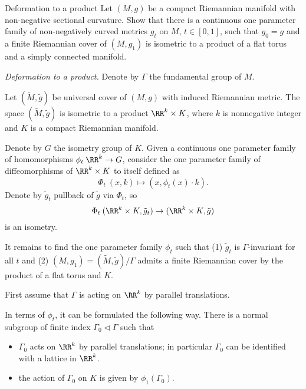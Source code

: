 



















\begin{pr}{}{Deformation to a product}\label{Deformation to a product} 
Let $(M,g)$ be a compact Riemannian manifold with non-negative sectional curvature. 
Show that there is a continuous one parameter family of non-negatively curved metrics $g_t$ on $M$, $t\in[0,1]$, 
such that $g_0=g$ and a finite Riemannian cover of $(M,g_1)$ is isometric to a product of a flat torus and a simply connected manifold.
\end{pr}

\textit{Deformation to a product.} 
Denote by $\Gamma$ the fundamental group of $M$.

Let $(\tilde M,\tilde g)$ be universal cover of $(M,g)$ with induced Riemannian metric.
The space $(\tilde M,\tilde g)$ is isometric to a product $\RR^k\times K$, 
where $k$ is nonnegative integer and $K$ is a compact Riemannian manifold.

Denote by $G$ the isometry group of $K$.
Given a continuous one parameter family of homomorphisms $\phi_t\:\RR^k\to G$,
consider the one parameter family of diffeomorphisms of $\RR^k\times K$ to itself defined as
\[\Phi_t\:(x,k)\mapsto (x,\phi_t(x)\cdot k).\]
Denote by 
 $\tilde g_t$ pullback 
of $\tilde g$ via $\Phi_t$,
so 
\[\Phi_t\:(\RR^k\times K,\tilde g_t)\to (\RR^k\times K,\tilde g)\]
is an isometry.

It remains to find the one parameter family $\phi_t$ such that 
(1) $\tilde g_t$ is $\Gamma$-invariant for all $t$
and (2) $(M,g_1)=(\tilde M,\tilde g)/\Gamma$ admits a finite Riemannian cover by the product of a flat torus and $K$.

First assume that $\Gamma$ is acting on $\RR^k$ by parallel translations.
 




In terms of $\phi_t$, it can be formulated the following way.
There is a normal subgroup of finite index $\Gamma_0\vartriangleleft\Gamma$ such that 
\begin{itemize}
\item $\Gamma_0$ acts on $\RR^k$ by parallel translations; 
in particular $\Gamma_0$ can be identified with a lattice in $\RR^k$.
\item the action of $\Gamma_0$ on $K$ is given by $\phi_1(\Gamma_0)$.
\end{itemize}


